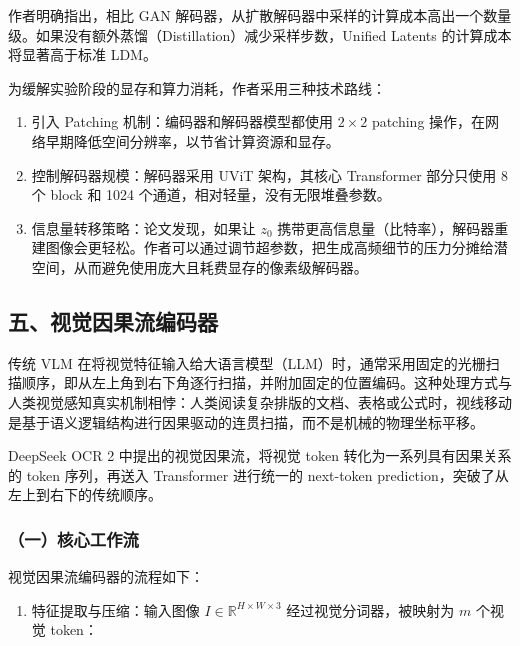 作者明确指出，相比 GAN 解码器，从扩散解码器中采样的计算成本高出一个数量级。如果没有额外蒸馏（Distillation）减少采样步数，Unified Latents 的计算成本将显著高于标准 LDM。

为缓解实验阶段的显存和算力消耗，作者采用三种技术路线：

\begin{enumerate}
\def\labelenumi{\arabic{enumi}.}
\tightlist
\item
  引入 Patching 机制：编码器和解码器模型都使用 \(2\times2\) patching 操作，在网络早期降低空间分辨率，以节省计算资源和显存。
\item
  控制解码器规模：解码器采用 UViT 架构，其核心 Transformer 部分只使用 8 个 block 和 1024 个通道，相对轻量，没有无限堆叠参数。
\item
  信息量转移策略：论文发现，如果让 \(z_0\) 携带更高信息量（比特率），解码器重建图像会更轻松。作者可以通过调节超参数，把生成高频细节的压力分摊给潜空间，从而避免使用庞大且耗费显存的像素级解码器。
\end{enumerate}

\hypertarget{ux4e94ux89c6ux89c9ux56e0ux679cux6d41ux7f16ux7801ux5668}{%
\subsection{五、视觉因果流编码器}\label{ux4e94ux89c6ux89c9ux56e0ux679cux6d41ux7f16ux7801ux5668}}

传统 VLM 在将视觉特征输入给大语言模型（LLM）时，通常采用固定的光栅扫描顺序，即从左上角到右下角逐行扫描，并附加固定的位置编码。这种处理方式与人类视觉感知真实机制相悖：人类阅读复杂排版的文档、表格或公式时，视线移动是基于语义逻辑结构进行因果驱动的连贯扫描，而不是机械的物理坐标平移。

DeepSeek OCR 2 中提出的视觉因果流，将视觉 token 转化为一系列具有因果关系的 token 序列，再送入 Transformer 进行统一的 next-token prediction，突破了从左上到右下的传统顺序。

\hypertarget{ux4e00ux6838ux5fc3ux5de5ux4f5cux6d41}{%
\subsubsection{（一）核心工作流}\label{ux4e00ux6838ux5fc3ux5de5ux4f5cux6d41}}

视觉因果流编码器的流程如下：

\begin{enumerate}
\def\labelenumi{\arabic{enumi}.}
\tightlist
\item
  特征提取与压缩：输入图像 \(I\in\mathbb{R}^{H\times W\times 3}\) 经过视觉分词器，被映射为 \(m\) 个视觉 token：
\end{enumerate}


